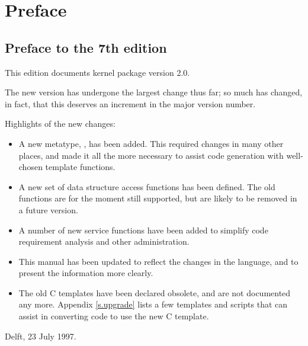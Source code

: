 \chapter{Preface}
\label{s.preface}
\section{Preface to the 7th edition}
This edition documents {\Tm} kernel package version 2.0.
\par
The new version has undergone the largest change thus far; so much
has changed, in fact, that this deserves an increment in the major
version number.
\par
Highlights of the new changes:
\begin{itemize}
\item A new metatype, , has been added. This required
changes in many other places, and made it all the more necessary
to assist code generation with well-chosen template functions.
\item A new set of data structure access functions has been defined.
The old functions are for the moment still supported, but are likely
to be removed in a future version.
\item A number of new service functions have been added to simplify
code requirement analysis and other administration.
\item This manual has been updated to reflect the changes in the
language, and to present the information more clearly.
\item The old C templates have been declared obsolete, and are
not documented any more. Appendix \ref{s.upgrade} lists a few templates and
scripts that can assist in converting code to use the new C template.
\end{itemize}
\begin{flushright}
Delft, 23 July 1997.
\end{flushright}
